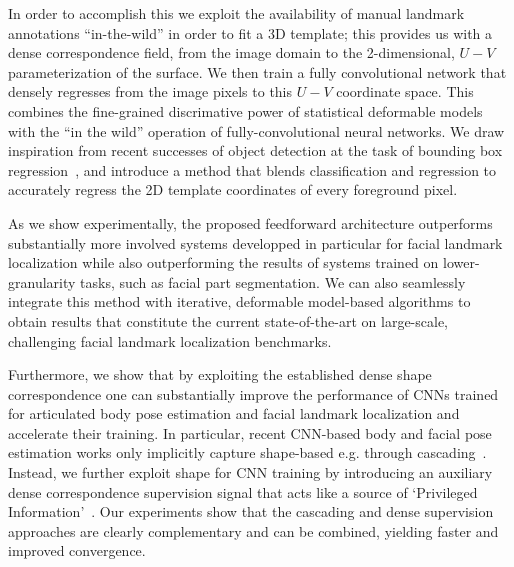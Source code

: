 In order to accomplish this 
    we exploit the availability of manual landmark annotations ``in-the-wild'' in order to fit a 3D template; this provides us with a dense correspondence field, from the image domain to the 2-dimensional, $U-V$ parameterization of the surface. We then train a fully convolutional network that densely regresses from the image pixels to this $U-V$ coordinate space. This combines the fine-grained discrimative power of statistical deformable models with the ``in the wild'' operation of fully-convolutional neural networks. 
    We draw inspiration from recent successes of object detection at the task of bounding box regression~\cite{ren2015faster}, and 
    introduce a method that blends classification and regression to accurately regress the 2D template coordinates of every foreground pixel.
    
    As we show experimentally, the proposed  feedforward architecture outperforms substantially more involved systems developped in particular for facial landmark localization while also outperforming the results of systems trained on lower-granularity tasks, such as facial part segmentation.
We can also seamlessly integrate this method with iterative, deformable model-based algorithms to obtain results that constitute the current state-of-the-art on large-scale, challenging facial landmark localization benchmarks.



Furthermore, we show that by exploiting the established dense shape correspondence one can substantially improve the performance of CNNs trained for articulated body pose estimation and facial landmark localization and accelerate their training. 
In particular, recent CNN-based body and facial pose estimation works  only implicitly capture shape-based e.g. through cascading~\cite{newell2016stacked}.  Instead, we further exploit shape for CNN  training by introducing an auxiliary dense correspondence supervision signal that acts like a source  of  `Privileged Information'~\cite{VapnikV09,lopez2015unifying,ChenJFY17}.
Our experiments show that the cascading and dense supervision approaches are clearly complementary and can be combined, yielding faster and improved convergence. 


